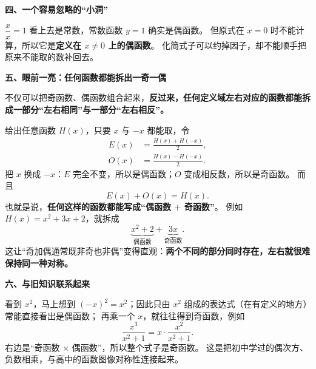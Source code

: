\clearpage
\begin{explanationbox}
\textbf{\textcolor{CExplanation}{四、一个容易忽略的“小洞”}}



$\dfrac{x}{x}=1$ 看上去是常数，常数函数 $y=1$ 确实是偶函数。
但原式在 $x=0$ 时不能计算，所以它是\textbf{定义在 $x\ne0$ 上的偶函数}。
化简式子可以约掉因子，却不能顺手把原来不能取的数补回去。

\medskip

\end{explanationbox}
\clearpage
\begin{explanationbox}
\textbf{\textcolor{CExplanation}{五、眼前一亮：任何函数都能拆出一奇一偶}}



不仅可以把奇函数、偶函数组合起来，\textbf{反过来，任何定义域左右对应的函数都能拆成一部分“左右相同”与一部分“左右相反”。}

给出任意函数 $H(x)$，只要 $x$ 与 $-x$ 都能取，令
\[
\boxed{\begin{aligned}
E(x)&=\frac{H(x)+H(-x)}{2},\\
O(x)&=\frac{H(x)-H(-x)}{2}.
\end{aligned}}
\]
把 $x$ 换成 $-x$：$E$ 完全不变，所以是偶函数；$O$ 变成相反数，所以是奇函数。
而且
\[
E(x)+O(x)=H(x).
\]
也就是说，\textbf{任何这样的函数都能写成“偶函数 $+$ 奇函数”}。
例如 $H(x)=x^2+3x+2$，就拆成
\[
\underbrace{x^2+2}_{\text{偶函数}}
+\underbrace{3x}_{\text{奇函数}}.
\]
这让“奇加偶通常既非奇也非偶”变得直观：\textbf{两个不同的部分同时存在，左右就很难保持同一种对称。}

\medskip

\end{explanationbox}
\clearpage
\begin{explanationbox}
\textbf{\textcolor{CExplanation}{六、与旧知识联系起来}}



看到 $x^2$，马上想到 $(-x)^2=x^2$；因此只由 $x^2$ 组成的表达式（在有定义的地方）常能直接看出是偶函数；
再乘一个 $x$，就往往得到奇函数，例如
\[
\frac{x^3}{x^2+1}
=x\cdot\frac{x^2}{x^2+1}.
\]
右边是“奇函数 $\times$ 偶函数”，所以整个式子是奇函数。
这是把初中学过的偶次方、负数相乘，与高中的函数图像对称性连接起来。
\end{explanationbox}
